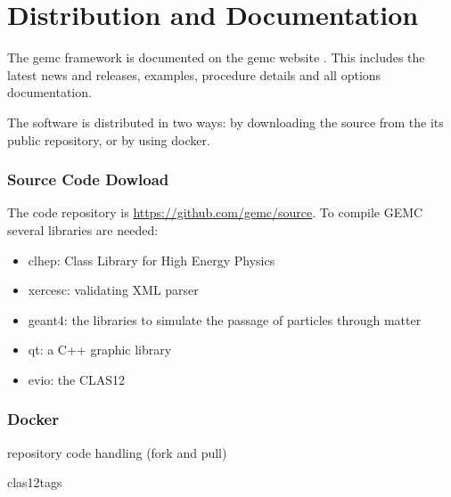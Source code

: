 \section{Distribution and Documentation}

The gemc framework is documented on the gemc website \cite{gemc}. This includes the latest news and releases,
examples, procedure details and all options documentation.

The software is distributed in two ways: by downloading the source from the its public repository, or by using docker.

\subsubsection{Source Code Dowload}

The code repository is \url{https://github.com/gemc/source}. To compile GEMC several libraries are needed:

\begin{itemize}
	\item clhep: Class Library for High Energy Physics \cite{clhep}
	\item xercesc: validating XML parser \cite{xercesc}
	\item geant4: the libraries to simulate the passage of particles through matter \cite{geant4}
	\item qt: a C++ graphic library \cite{qt}
	\item evio: the CLAS12 
\end{itemize}


\subsubsection{Docker}




repository code handling (fork and pull)

clas12tags




